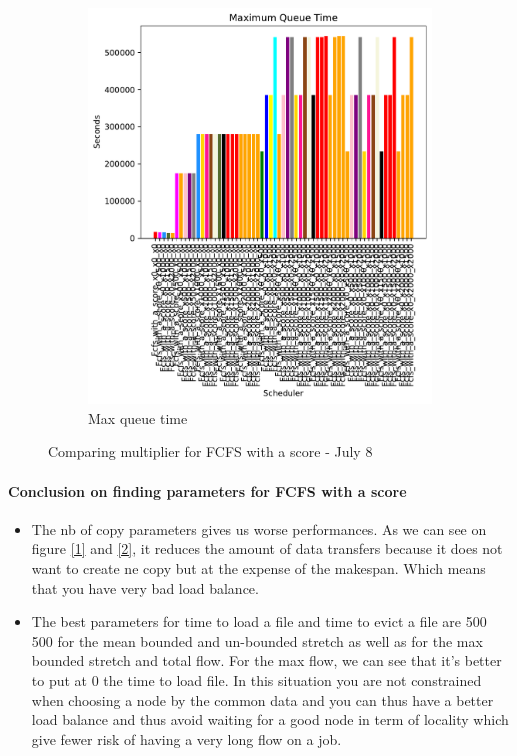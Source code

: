 \documentclass[a4paper]{article}
\begin{document}
\begin{figure}[H]
\begin{subfigure}[b]{0.4\linewidth}\centering\includegraphics[width=1\linewidth]{MBSS/plot/FCFS_Score_2022-01-24->2022-01-24_Maximum_queue_time_450_128_32_256_4_1024.pdf}\caption{Max queue time}\label{0}\end{subfigure}
\caption{Comparing multiplier for FCFS with a score - July 8}\end{figure}

\paragraph {Conclusion on finding parameters for FCFS with a score}
\begin{itemize}
	\item The nb of copy parameters gives us worse performances. As we can see on figure \ref{1} and \ref{2}, it reduces
	the amount of data transfers because it does not want to create ne copy but at the expense of the makespan. Which means that 
	you have very bad load balance.
	\item The best parameters for time to load a file and time to evict a file are 500 500 for the mean bounded and un-bounded stretch as well as for the max bounded stretch and total flow. For the max flow, we can see that it's better to put at 0 the time to load file. In this situation you are not constrained when choosing a node by the common data and you can thus have a better load balance and thus avoid waiting for a good node in term of locality which give fewer risk of having a very long flow on a job.
\end{itemize}
\end{document}
